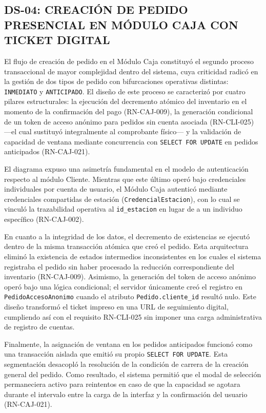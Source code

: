 \subsection{DS-04: CREACIÓN DE PEDIDO PRESENCIAL EN MÓDULO CAJA CON TICKET DIGITAL}
El flujo de creación de pedido en el Módulo Caja constituyó el segundo proceso transaccional de mayor complejidad dentro del sistema, cuya criticidad radicó en la gestión de dos tipos de pedido con bifurcaciones operativas distintas: \texttt{INMEDIATO} y \texttt{ANTICIPADO}. El diseño de este proceso se caracterizó por cuatro pilares estructurales: la ejecución del decremento atómico del inventario en el momento de la confirmación del pago (RN-CAJ-009), la generación condicional de un token de acceso anónimo para pedidos sin cuenta asociada (RN-CLI-025) ---el cual sustituyó integralmente al comprobante físico--- y la validación de capacidad de ventana mediante concurrencia con \texttt{SELECT FOR UPDATE} en pedidos anticipados (RN-CAJ-021). 

El diagrama expuso una asimetría fundamental en el modelo de autenticación respecto al módulo Cliente. Mientras que este último operó bajo credenciales individuales por cuenta de usuario, el Módulo Caja autenticó mediante credenciales compartidas de estación (\texttt{CredencialEstacion}), con lo cual se vinculó la trazabilidad operativa al \texttt{id\_estacion} en lugar de a un individuo específico (RN-CAJ-002). 

En cuanto a la integridad de los datos, el decremento de existencias se ejecutó dentro de la misma transacción atómica que creó el pedido. Esta arquitectura eliminó la existencia de estados intermedios inconsistentes en los cuales el sistema registraba el pedido sin haber procesado la reducción correspondiente del inventario (RN-CAJ-009). Asimismo, la generación del token de acceso anónimo operó bajo una lógica condicional; el servidor únicamente creó el registro en \texttt{PedidoAccesoAnonimo} cuando el atributo \texttt{Pedido.cliente\_id} resultó nulo. Este diseño transformó el ticket impreso en una URL de seguimiento digital, cumpliendo así con el requisito RN-CLI-025 sin imponer una carga administrativa de registro de cuentas. 

Finalmente, la asignación de ventana en los pedidos anticipados funcionó como una transacción aislada que emitió su propio \texttt{SELECT FOR UPDATE}. Esta segmentación desacopló la resolución de la condición de carrera de la creación general del pedido. Como resultado, el sistema permitió que el modal de selección permaneciera activo para reintentos en caso de que la capacidad se agotara durante el intervalo entre la carga de la interfaz y la confirmación del usuario (RN-CAJ-021). 

